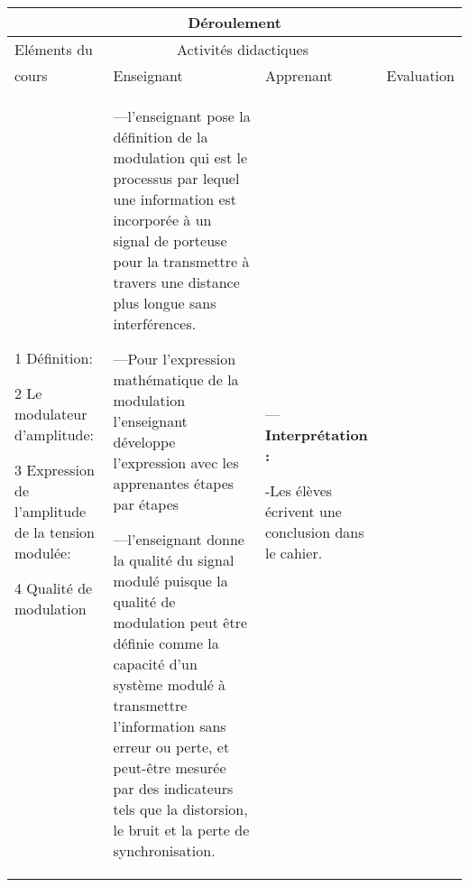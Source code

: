 \documentclass[12pt]{article}
\begin{document}
\begin{center}
	 \begin{tabular}{|p{}||p{}||p{}||p{}|}
\hline
\multicolumn{4}{|c|}{Déroulement}\\\hline
Eléments du & \multicolumn{2}{c||}{Activités didactiques} &  \\\cline{2-3}
cours & Enseignant & Apprenant & Evaluation\\\hline

\color{red}{III Modulation d’amplitude:}

\vspace{0.5cm}
\color{blue}1
Définition:

\vspace{0.5cm}
\color{blue}2 Le modulateur d’amplitude:

\vspace{0.5cm}
\color{blue}3 Expression de l’amplitude de la tension modulée:


\vspace{0.5cm}
\color{blue}4 	Qualité de modulation 


	  &
---l'enseignant pose la définition de la modulation qui est le processus par lequel une information est incorporée à un signal de porteuse pour la transmettre à travers une distance plus longue sans interférences.


	  \vspace{0.2cm}

---Pour l'expression mathématique de la modulation l'enseignant développe l'expression avec les apprenantes étapes par étapes
	
\vspace{0.5cm}

---l'enseignant donne la qualité du signal modulé puisque la qualité de modulation peut être définie comme la capacité d'un système modulé à transmettre l'information sans erreur ou perte, et peut-être mesurée par des indicateurs tels que la distorsion, le bruit et la perte de synchronisation.

\vspace{0.2cm}


\vspace{0.2cm}







				  &

---\textbf{Interprétation : }

-Les élèves écrivent une conclusion dans le cahier.
\vspace{0.5cm}


\end{tabular}
\end{center}
\end{document}
